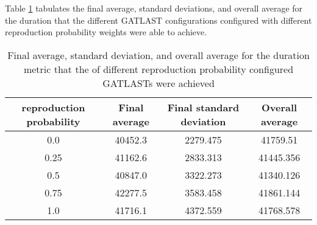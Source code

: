 Table \ref{tab:HP:GA:reproductionProp:duration} tabulates the final average, standard deviations, and overall average for the duration that the different GATLAST configurations configured with different reproduction probability weights were able to achieve.
\begin{table}[tbh!]
\centering
\begin{adjustbox}{trim=0cm 0cm 0cm 0cm, clip=true}
\begin{tabular}{|c|c|c|c|}
\hline
reproduction probability & Final average & Final standard deviation & Overall average\\
\hline
0.0 & 40452.3 & 2279.475 & 41759.51\\\hline
0.25 & 41162.6 & 2833.313 & 41445.356\\\hline
0.5 & 40847.0 & 3322.273 & 41340.126\\\hline
0.75 & 42277.5 & 3583.458 & 41861.144\\\hline
1.0 & 41716.1 & 4372.559 & 41768.578\\\hline
\end{tabular}
\end{adjustbox}
\caption{Final average, standard deviation, and overall average for the duration metric that the of different reproduction probability configured GATLASTs were achieved}
\label{tab:HP:GA:reproductionProp:duration}
\end{table}